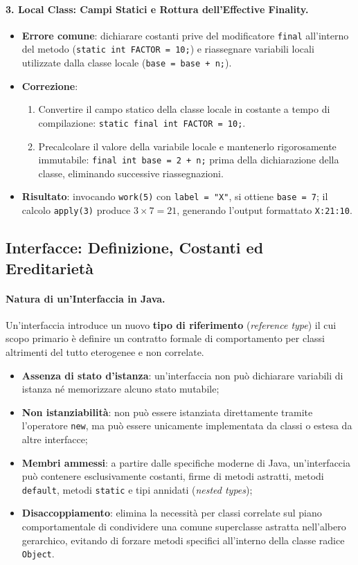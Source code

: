 \documentclass[12pt]{extarticle}
\begin{document}
\paragraph{3. Local Class: Campi Statici e Rottura dell'Effective Finality.}
\begin{itemize}
    \item \textbf{Errore comune}: dichiarare costanti prive del modificatore \texttt{final} all'interno del metodo (\texttt{static int FACTOR = 10;}) e riassegnare variabili locali utilizzate dalla classe locale (\texttt{base = base + n;}).
    \item \textbf{Correzione}:
    \begin{enumerate}
        \item Convertire il campo statico della classe locale in costante a tempo di compilazione: \texttt{static final int FACTOR = 10;}.
        \item Precalcolare il valore della variabile locale e mantenerlo rigorosamente immutabile: \texttt{final int base = 2 + n;} prima della dichiarazione della classe, eliminando successive riassegnazioni.
    \end{enumerate}
    \item \textbf{Risultato}: invocando \texttt{work(5)} con \texttt{label = "X"}, si ottiene \texttt{base = 7}; il calcolo \texttt{apply(3)} produce $3 \times 7 = 21$, generando l'output formattato \texttt{X:21:10}.
\end{itemize}

\subsection{Interfacce: Definizione, Costanti ed Ereditarietà}

\paragraph{Natura di un'Interfaccia in Java.}
Un'interfaccia introduce un nuovo \textbf{tipo di riferimento} (\textit{reference type}) il cui scopo primario è definire un contratto formale di comportamento per classi altrimenti del tutto eterogenee e non correlate.
\begin{itemize}
    \item \textbf{Assenza di stato d'istanza}: un'interfaccia non può dichiarare variabili di istanza né memorizzare alcuno stato mutabile;
    \item \textbf{Non istanziabilità}: non può essere istanziata direttamente tramite l'operatore \texttt{new}, ma può essere unicamente implementata da classi o estesa da altre interfacce;
    \item \textbf{Membri ammessi}: a partire dalle specifiche moderne di Java, un'interfaccia può contenere esclusivamente costanti, firme di metodi astratti, metodi \texttt{default}, metodi \texttt{static} e tipi annidati (\textit{nested types});
    \item \textbf{Disaccoppiamento}: elimina la necessità per classi correlate sul piano comportamentale di condividere una comune superclasse astratta nell'albero gerarchico, evitando di forzare metodi specifici all'interno della classe radice \texttt{Object}.
\end{itemize}
\end{document}
